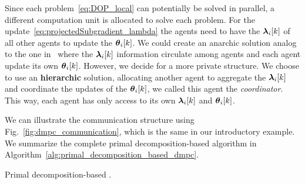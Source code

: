 \documentclass[../main.tex]{subfiles}
\begin{document}
Since each problem~\eqref{eq:DOP_local} can potentially be solved in parallel, a different computation unit is allocated to solve each problem.
For the update~\eqref{eq:projectedSubgradient_lambda} the agents need to have the $\lambdaik$ of all other agents to update the $\thetaik$.
We could create an anarchic solution analog to the one in~\cite{VelardeEtAl2018} where the $\lambdaik$ information circulate among agents and each agent update its own $\thetaik$.
However, we decide for a more private structure.
We choose to use an \textbf{hierarchic} solution, allocating another agent to aggregate the $\lambdaik$ and coordinate the updates of the $\thetaik$, we called this agent the \emph{coordinator}.
This way, each agent has only access to its own $\lambdaik$ and $\thetaik$.

We can illustrate the communication structure using Fig.~\ref{fig:dmpc_communication}, which is the same in our introductory example.
We summarize the complete primal decomposition-based \dmpc{} algorithm in Algorithm~\ref{alg:primal_decomposition_based_dmpc}.

\begin{algorithm2e}[h]
  \DontPrintSemicolon%
  \caption{Primal decomposition-based \dmpc{}.}\label{alg:primal_decomposition_based_dmpc}
\end{algorithm2e}
\end{document}
